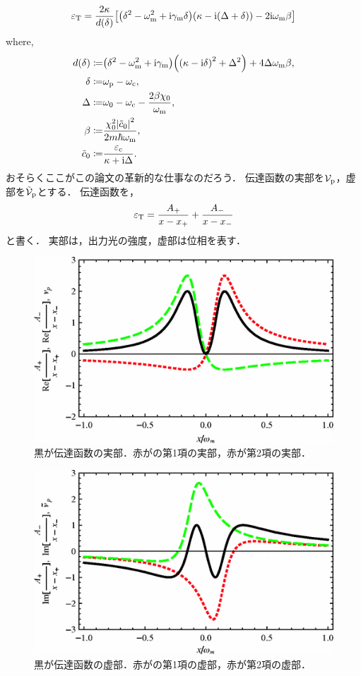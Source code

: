 \documentclass{report}
\begin{document}
      \begin{align}
        \varepsilon_{\mathrm{T}} = \frac{2\kappa}{d(\delta)}\qty[\qty(\delta^2 - \omega^2_{\mathrm{m}} + \mathrm{i}\gamma_{\mathrm{m}}\delta)\qty(\kappa - \mathrm{i}\qty(\Delta + \delta)) - 2\mathrm{i}\omega_{\mathrm{m}}\beta] \\ 
      \end{align}
      where,
      \begin{align}
        d(\delta) \coloneqq& \qty(\delta^2 - \omega^2_{\mathrm{m}} + \mathrm{i}\gamma_{\mathrm{m}})\qty(\qty(\kappa - \mathrm{i}\delta)^2 + \Delta^2) + 4\Delta\omega_{\mathrm{m}}\beta, \\ 
        \delta \coloneqq& \omega_{\mathrm{p}} - \omega_{\mathrm{c}}, \\ 
        \Delta \coloneqq& \omega_0 - \omega_{\mathrm{c}} - \frac{2\beta\chi_0}{\omega_{\mathrm{m}}}, \\ 
        \beta \coloneqq& \frac{\chi^2_0\abs{\tilde{c}_0}^2}{2m\hbar\omega_{\mathrm{m}}}, \\ 
        \tilde{c}_0 \coloneqq& \frac{\varepsilon_{\mathrm{c}}}{\kappa + \mathrm{i}\Delta}.
      \end{align}
      おそらくここがこの論文の革新的な仕事なのだろう．
      伝達函数の実部を$\mathcal{V}_{\mathrm{p}}$，虚部を$\tilde{\mathcal{V}}_{\mathrm{p}}$とする．
      伝達函数を，
      \begin{align}
        \varepsilon_{\mathrm{T}} = \frac{A_+}{x - x_+} + \frac{A_-}{x - x_-} \label{PhysRevA.81.041803-trans}
      \end{align}
      と書く．
      実部は，出力光の強度，虚部は位相を表す．
      \begin{figure}[H]
        \centering
        \includegraphics[width = 0.5\linewidth]{./src/Electromagnetically_induced_transparency_in_mechanical_effects_of_light/4.png}
        \caption{黒が伝達函数の実部．赤がの第1項の実部，赤が第2項の実部．}
      \end{figure}
      \begin{figure}[H]
        \centering
        \includegraphics[width = 0.5\linewidth]{./src/Electromagnetically_induced_transparency_in_mechanical_effects_of_light/5.png}
        \caption{黒が伝達函数の虚部．赤がの第1項の虚部，赤が第2項の虚部．}
      \end{figure}
\end{document}
